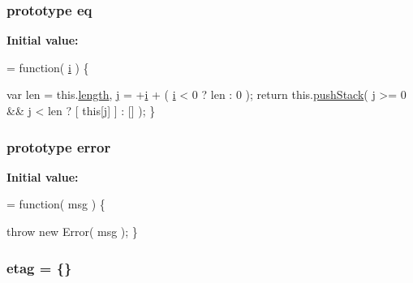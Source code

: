 \subsubsection[{eq}]{ {\bf prototype} eq}\label{jquery-1_810_82-vsdoc_8js_a57adf3cfa88f689534e187b77491d52d}
{\bfseries Initial value\+:}
\begin{DoxyCode}
= \textcolor{keyword}{function}( \hyperlink{_bibabook_2_scripts_2respond_8min_8js_a5e25b1d1bed9ab5f3174b76d6a722180}{i} ) \{


        var len = this.\hyperlink{jquery-1_810_82-vsdoc_8js_aa7de35d58da66d9944ab9cbe82c19640}{length},
            \hyperlink{_bibabook_2_scripts_2jquery_8validate_8unobtrusive_8min_8js_a5f7d9fc7ba35dc513eb3080d74d27476}{j} = +\hyperlink{_bibabook_2_scripts_2respond_8min_8js_a5e25b1d1bed9ab5f3174b76d6a722180}{i} + ( \hyperlink{_bibabook_2_scripts_2respond_8min_8js_a5e25b1d1bed9ab5f3174b76d6a722180}{i} < 0 ? len : 0 );
        \textcolor{keywordflow}{return} this.\hyperlink{jquery-1_810_82-vsdoc_8js_afc3a7db1ef2b526338c06c07cecccd44}{pushStack}( j >= 0 && j < len ? [ \textcolor{keyword}{this}[j] ] : [] );
    \}
\end{DoxyCode}
\hypertarget{jquery-1_810_82-vsdoc_8js_acd25716dc66c2c57df2fc97807ffbddf}{}
\subsubsection[{error}]{ {\bf prototype} error}\label{jquery-1_810_82-vsdoc_8js_acd25716dc66c2c57df2fc97807ffbddf}
{\bfseries Initial value\+:}
\begin{DoxyCode}
= \textcolor{keyword}{function}( msg ) \{


        \textcolor{keywordflow}{throw} \textcolor{keyword}{new} Error( msg );
    \}
\end{DoxyCode}
\hypertarget{jquery-1_810_82-vsdoc_8js_afef53404a8ff79eab1ee39c165d6ba37}{}
\subsubsection[{etag}]{ etag = \{\}}\label{jquery-1_810_82-vsdoc_8js_afef53404a8ff79eab1ee39c165d6ba37}
\hypertarget{jquery-1_810_82-vsdoc_8js_a2cc2bb482e56b47f47b4ee54d670a418}{}

